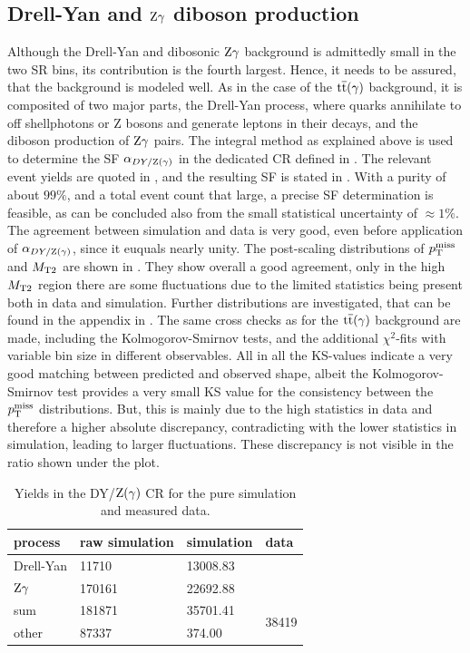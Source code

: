 \subsection{Drell-Yan and $\mathrm{Z}\gamma$ diboson production}
Although the Drell-Yan and dibosonic $\mathrm{Z}\gamma$ background is admittedly small in the two SR bins, its contribution is the fourth largest. Hence, it needs to be assured, that the background is modeled well. As in the case of the ${\mathrm{t}\overline{\mathrm{t}}}(\gamma)$ background, it is composited of two major parts, the Drell-Yan process, where quarks annihilate to off shellphotons or Z bosons and generate leptons in their decays, and the diboson production of $\mathrm{Z}\gamma$ pairs. The integral method as explained above is used to determine the SF $\alpha_{DY/\mathrm{Z}(\gamma)}$ in the dedicated CR defined in . The relevant event yields are quoted in , and the resulting SF is stated in . With a purity of about $99\%$, and a total event count that large, a precise SF determination is feasible, as can be concluded also from the small statistical uncertainty of $\approx1\%$. The agreement between simulation and data is very good, even before application of $\alpha_{DY/\mathrm{Z}(\gamma)}$, since it euquals nearly unity. The post-scaling distributions of $p_{\mathrm{T}}^\text{miss}$ and $M_{\mathrm{T2}}$ are shown in . They show overall a good agreement, only in the high $M_{\mathrm{T2}}$ region there are some fluctuations due to the limited statistics being present both in data and simulation. Further distributions are investigated, that can be found in the appendix in . The same cross checks as for the ${\mathrm{t}\overline{\mathrm{t}}}(\gamma)$ background are made, including the Kolmogorov-Smirnov tests, and the additional $\chi^2$-fits with variable bin size in different observables.
All in all the KS-values indicate a very good matching between predicted and observed shape, albeit the Kolmogorov-Smirnov test provides a very small KS value for the consistency between the $p_{\mathrm{T}}^\text{miss}$ distributions. But, this is mainly due to the high statistics in data and therefore a higher absolute discrepancy, contradicting with the lower statistics in simulation, leading to larger fluctuations. These discrepancy is not visible in the ratio shown under the plot.\\
\begin{table}[tbp]
 \centering
 \caption{Yields in the DY/$\mathrm{Z}(\gamma)$ CR for the pure simulation and measured data.}
 \label{tab:CRDY}
 \begin{tabular}{llll}
  
  process   & raw simulation & simulation & data                   \\\hline
  Drell-Yan & 11710          & 13008.83   &                        \\
  $\mathrm{Z}\gamma$ & 170161         & 22692.88   &                        \\\hline\hline
  sum       & 181871         & 35701.41   & \multirow{2}{*}{38419} \\
  other     & 87337          & 374.00     &                        
 \end{tabular}
\end{table}
